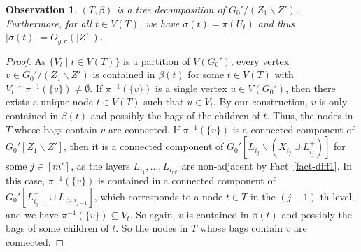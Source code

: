 \documentclass[a4paper,11pt]{article}
\numberwithin{lemma}{section}
\newtheorem{observation}[lemma]{Observation}
\begin{document}
\begin{observation} \label{obs-treedecomp}
$(T,\beta)$ is a tree decomposition of $G_0'/(Z_1 \backslash Z')$. Furthermore, for all $t \in V(T)$, we have $\sigma(t) = \pi(U_t)$ and thus $|\sigma(t)| = O_{g,c}(|Z'|)$.
\end{observation}
\begin{proof}
As $\{V_t \mid t \in V(T)\}$ is a partition of $V(G_0')$, every vertex $v \in G_0'/(Z_1 \backslash Z')$ is contained in $\beta(t)$ for some $t \in V(T)$ with $V_t \cap \pi^{-1}(\{v\}) \neq \emptyset$.
If $\pi^{-1}(\{v\})$ is a single vertex $u \in V(G_0')$, then there exists a unique node $t \in V(T)$ such that $u \in V_t$.
By our construction, $v$ is only contained in $\beta(t)$ and possibly the bags of the children of $t$.
Thus, the nodes in $T$ whose bags contain $v$ are connected.
If $\pi^{-1}(\{v\})$ is a connected component of $G_0'[Z_1 \backslash Z']$, then it is a connected component of $G_0'[L_{i_j} \backslash (X_{i_j} \cup L_{i_j}^+)]$ for some $j \in [m']$, as the layers $L_{i_1},\dots,L_{i_{m'}}$ are non-adjacent by Fact~\ref{fact-diff1}.
In this case, $\pi^{-1}(\{v\})$ is contained in a connected component of $G_0'[L_{i_{j-1}}^+ \cup L_{>i_{j-1}}]$, which corresponds to a node $t \in T$ in the $(j-1)$-th level, and we have $\pi^{-1}(\{v\}) \subseteq V_t$.
So again, $v$ is contained in $\beta(t)$ and possibly the bags of some children of $t$.
So the nodes in $T$ whose bags contain $v$ are connected.


\end{proof}
\end{document}
